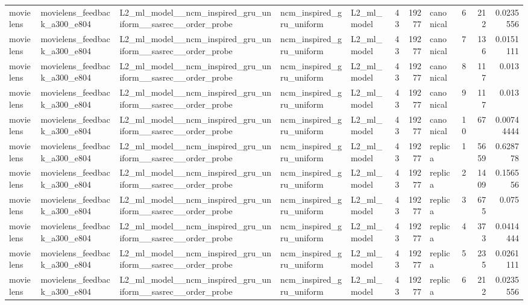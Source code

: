 \begin{table}[htbp!]
\begin{tabular}{lllllrrlrrr}
movielens & movielens\_feedback\_a300\_e804 & L2\_ml\_model\_\_ncm\_inspired\_gru\_uniform\_\_sasrec\_\_order\_probe & ncm\_inspired\_gru\_uniform & L2\_ml\_model & 43 & 19277 & canonical & 6 & 212 & 0.0235556 \\
movielens & movielens\_feedback\_a300\_e804 & L2\_ml\_model\_\_ncm\_inspired\_gru\_uniform\_\_sasrec\_\_order\_probe & ncm\_inspired\_gru\_uniform & L2\_ml\_model & 43 & 19277 & canonical & 7 & 136 & 0.0151111 \\
movielens & movielens\_feedback\_a300\_e804 & L2\_ml\_model\_\_ncm\_inspired\_gru\_uniform\_\_sasrec\_\_order\_probe & ncm\_inspired\_gru\_uniform & L2\_ml\_model & 43 & 19277 & canonical & 8 & 117 & 0.013 \\
movielens & movielens\_feedback\_a300\_e804 & L2\_ml\_model\_\_ncm\_inspired\_gru\_uniform\_\_sasrec\_\_order\_probe & ncm\_inspired\_gru\_uniform & L2\_ml\_model & 43 & 19277 & canonical & 9 & 117 & 0.013 \\
movielens & movielens\_feedback\_a300\_e804 & L2\_ml\_model\_\_ncm\_inspired\_gru\_uniform\_\_sasrec\_\_order\_probe & ncm\_inspired\_gru\_uniform & L2\_ml\_model & 43 & 19277 & canonical & 10 & 67 & 0.00744444 \\
movielens & movielens\_feedback\_a300\_e804 & L2\_ml\_model\_\_ncm\_inspired\_gru\_uniform\_\_sasrec\_\_order\_probe & ncm\_inspired\_gru\_uniform & L2\_ml\_model & 43 & 19277 & replica & 1 & 5659 & 0.628778 \\
movielens & movielens\_feedback\_a300\_e804 & L2\_ml\_model\_\_ncm\_inspired\_gru\_uniform\_\_sasrec\_\_order\_probe & ncm\_inspired\_gru\_uniform & L2\_ml\_model & 43 & 19277 & replica & 2 & 1409 & 0.156556 \\
movielens & movielens\_feedback\_a300\_e804 & L2\_ml\_model\_\_ncm\_inspired\_gru\_uniform\_\_sasrec\_\_order\_probe & ncm\_inspired\_gru\_uniform & L2\_ml\_model & 43 & 19277 & replica & 3 & 675 & 0.075 \\
movielens & movielens\_feedback\_a300\_e804 & L2\_ml\_model\_\_ncm\_inspired\_gru\_uniform\_\_sasrec\_\_order\_probe & ncm\_inspired\_gru\_uniform & L2\_ml\_model & 43 & 19277 & replica & 4 & 373 & 0.0414444 \\
movielens & movielens\_feedback\_a300\_e804 & L2\_ml\_model\_\_ncm\_inspired\_gru\_uniform\_\_sasrec\_\_order\_probe & ncm\_inspired\_gru\_uniform & L2\_ml\_model & 43 & 19277 & replica & 5 & 235 & 0.0261111 \\
movielens & movielens\_feedback\_a300\_e804 & L2\_ml\_model\_\_ncm\_inspired\_gru\_uniform\_\_sasrec\_\_order\_probe & ncm\_inspired\_gru\_uniform & L2\_ml\_model & 43 & 19277 & replica & 6 & 212 & 0.0235556 \\

\end{tabular}
\end{table}
